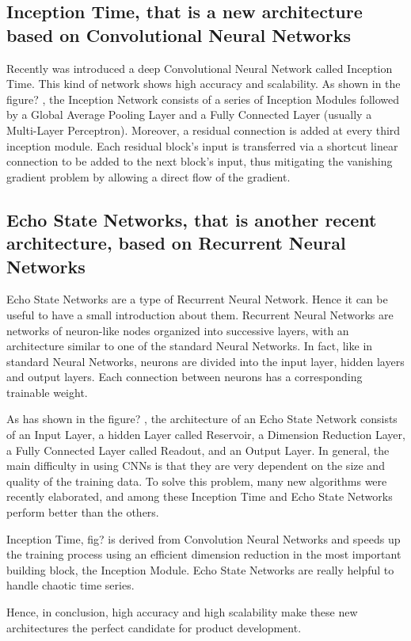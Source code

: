 \documentclass[review]{elsarticle}
\begin{document}
\subsection{Inception Time, that is a new architecture based on Convolutional Neural Networks }
Recently was introduced a deep Convolutional Neural Network called Inception Time. This kind of network shows high accuracy and scalability. As shown in the figure? , the Inception Network consists of a series of Inception Modules followed by a Global Average Pooling Layer and a Fully Connected Layer (usually a Multi-Layer Perceptron). Moreover, a residual connection is added at every third inception module. Each residual block’s input is transferred via a shortcut linear connection to be added to the next block’s input, thus mitigating the vanishing gradient problem by allowing a direct flow of the gradient.

\subsection{Echo State Networks, that is another recent architecture, based on Recurrent Neural Networks }
Echo State Networks are a type of Recurrent Neural Network. Hence it can be useful to have a small introduction about them. Recurrent Neural Networks are networks of neuron-like nodes organized into successive layers, with an architecture similar to one of the standard Neural Networks. In fact, like in standard Neural Networks, neurons are divided into the input layer, hidden layers and output layers. Each connection between neurons has a corresponding trainable weight.  

As has shown in the figure? , the architecture of an Echo State Network consists of an Input Layer, a hidden Layer called Reservoir, a Dimension Reduction Layer, a Fully Connected Layer called Readout, and an Output Layer.
In general, the main difficulty in using CNNs is that they are very dependent on the size and quality of the training data. To solve this problem, many new algorithms were recently elaborated, and among these Inception Time and Echo State Networks perform better than the others. 

Inception Time, fig?  is derived from Convolution Neural Networks and speeds up the training process using an efficient dimension reduction in the most important building block, the Inception Module. Echo State Networks are really helpful to handle chaotic time series. 

Hence, in conclusion, high accuracy and high scalability make these new architectures the perfect candidate for product development.

 
\end{document}
